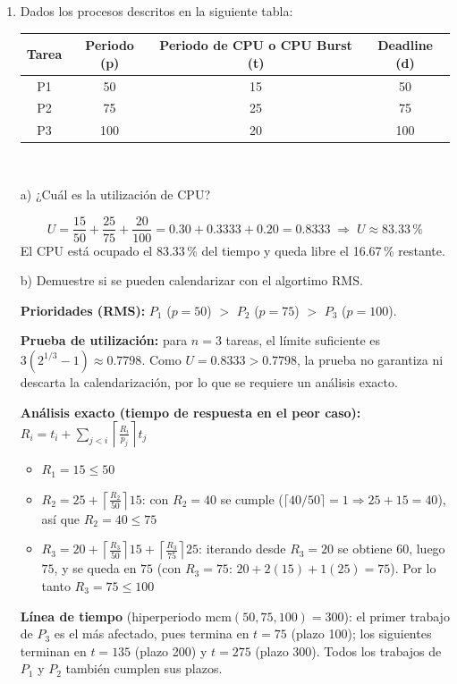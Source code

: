 \documentclass[a4paper, 11pt]{article}
\newcommand{\Aspace}{0.2cm}
\begin{document}
\begin{enumerate}
{        }



    \item Dados los procesos descritos en la siguiente tabla: \par
    \begin{tabular}{|c|c|c|c|}
        \hline
        \textbf{Tarea} & \textbf{Periodo (p)} & \textbf{Periodo de CPU o CPU Burst (t)} & \textbf{Deadline (d)} \\
        \hline
        P1 & 50 & 15 & 50 \\
        \hline
        P2 & 75 & 25 & 75 \\
        \hline
        P3 & 100 & 20 & 100 \\
        \hline
    \end{tabular} \\
        \vspace{\Aspace} \par
        a) ¿Cuál es la utilización de CPU?
        \par { \color{azul} 
        \[
            U = \frac{15}{50} + \frac{25}{75} + \frac{20}{100} = 0.30 + 0.3333 + 0.20 = 0.8333 \;\Rightarrow\; U \approx 83.33\,\%
        \]
        El CPU está ocupado el 83.33\,\% del tiempo y queda libre el 16.67\,\% restante.
        }

        \vspace{\Aspace} \par
        b) Demuestre si se pueden calendarizar con el algortimo RMS.
        \par { \color{azul} 
        \textbf{Prioridades (RMS):} $P_1$ ($p=50$) $>$ $P_2$ ($p=75$) $>$ $P_3$ ($p=100$).

        \textbf{Prueba de utilización:} para $n=3$ tareas, el límite suficiente es $3\left(2^{1/3}-1\right) \approx 0.7798$. Como $U = 0.8333 > 0.7798$, la prueba no garantiza ni descarta la calendarización, por lo que se requiere un análisis exacto.

        \textbf{Análisis exacto (tiempo de respuesta en el peor caso):} $R_i = t_i + \sum_{j<i} \left\lceil \frac{R_i}{p_j} \right\rceil t_j$
        \begin{itemize}
            \item $R_1 = 15 \le 50$ \checkmark
            \item $R_2 = 25 + \left\lceil \frac{R_2}{50} \right\rceil 15$: con $R_2=40$ se cumple ($\lceil 40/50 \rceil = 1 \Rightarrow 25+15=40$), así que $R_2 = 40 \le 75$ \checkmark
            \item $R_3 = 20 + \left\lceil \frac{R_3}{50} \right\rceil 15 + \left\lceil \frac{R_3}{75} \right\rceil 25$: iterando desde $R_3=20$ se obtiene $60$, luego $75$, y se queda en $75$ (con $R_3=75$: $20 + 2(15) + 1(25) = 75$). Por lo tanto $R_3 = 75 \le 100$ \checkmark
        \end{itemize}
        \textbf{Línea de tiempo} (hiperperiodo $\mathrm{mcm}(50,75,100)=300$): el primer trabajo de $P_3$ es el más afectado, pues termina en $t=75$ (plazo 100); los siguientes terminan en $t=135$ (plazo 200) y $t=275$ (plazo 300). Todos los trabajos de $P_1$ y $P_2$ también cumplen sus plazos.

}
\end{enumerate}
\end{document}
